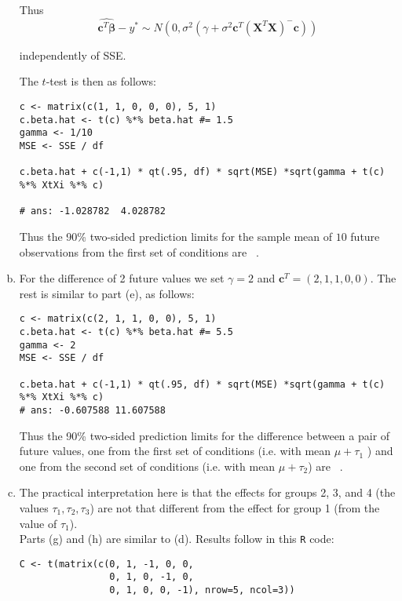 \documentclass[paper=a4, fontsize=11pt]{scrartcl} %
\newcommand{\vecBeta}{\mathbf{\beta}}
\newcommand{\vecC}{\mathbf{c}}
\newcommand{\matX}{\mathbf{X}}
\begin{document}
\begin{enumerate}[(a)]
Thus 
$$
\widehat{\vecC^T \vecBeta} - y^* \sim  N \left( 0, \sigma^2 (\gamma + \sigma^2\vecC^T (\matX^T \matX)^- \vecC) \right)
$$

independently of SSE. 






The $t$-test is then as follows:\\

 \begin{lstlisting}[basicstyle=\ttfamily\small\bfseries]
c <- matrix(c(1, 1, 0, 0, 0), 5, 1)
c.beta.hat <- t(c) %*% beta.hat #= 1.5
gamma <- 1/10
MSE <- SSE / df

c.beta.hat + c(-1,1) * qt(.95, df) * sqrt(MSE) *sqrt(gamma + t(c) %*% XtXi %*% c)

# ans: -1.028782  4.028782
\end{lstlisting}

Thus the 90\% two-sided prediction limits for the sample mean of $10$ future observations from
the first set of conditions are  \ . \\



\item For the difference of 2 future values we set $\gamma = 2$ and $\vecC^T = (2, 1, 1, 0, 0)$. The rest
is similar to part (e), as follows:\\
 \begin{lstlisting}[basicstyle=\ttfamily\small\bfseries]
c <- matrix(c(2, 1, 1, 0, 0), 5, 1)
c.beta.hat <- t(c) %*% beta.hat #= 5.5
gamma <- 2
MSE <- SSE / df

c.beta.hat + c(-1,1) * qt(.95, df) * sqrt(MSE) *sqrt(gamma + t(c) %*% XtXi %*% c)
# ans: -0.607588 11.607588
\end{lstlisting}

Thus the 90\% two-sided prediction limits for the difference between a pair of future values, one
from the first set of conditions (i.e. with mean  $\mu + \tau_1$ ) and one from the second set of conditions
(i.e. with mean  $\mu + \tau_2$) are  \ . \\


\item The practical interpretation here is that the effects for groups 2, 3, and 4 (the values $\tau_1, \tau_2, \tau_3$) are not that different 
from the effect for group 1 (from the value of $\tau_1$). \\

Parts (g) and (h) are similar to (d). Results follow in this \texttt{R} code:\\
 \begin{lstlisting}[basicstyle=\ttfamily\small\bfseries]
C <- t(matrix(c(0, 1, -1, 0, 0,
                0, 1, 0, -1, 0,
                0, 1, 0, 0, -1), nrow=5, ncol=3))


\end{lstlisting}
\end{enumerate}
\end{document}
